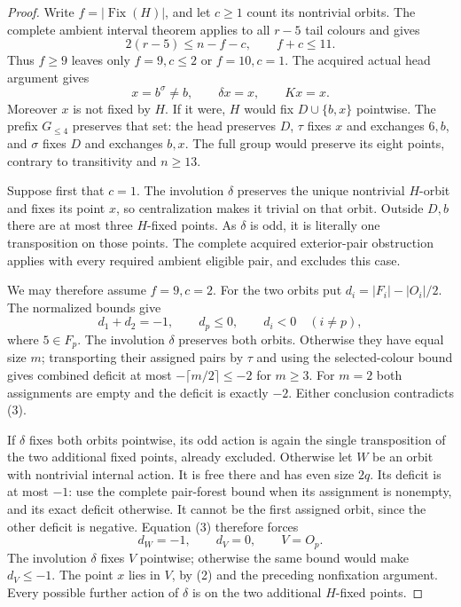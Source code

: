 \documentclass[11pt,a4paper]{article}
\begin{document}
\begin{proof}
Write $f=|\operatorname{Fix}(H)|$, and let $c\ge1$ count
its nontrivial orbits. The complete ambient interval theorem
applies to all $r-5$ tail colours and gives
\[
                  2(r-5)\le n-f-c,\qquad f+c\le11.       \tag{1}
\]
Thus $f\ge9$ leaves only $f=9,c\le2$ or $f=10,c=1$.
The acquired actual head argument gives
\[
             x=b^\sigma\ne b,\qquad \delta x=x,\qquad Kx=x.
                                                               \tag{2}
\]
Moreover $x$ is not fixed by $H$. If it were, $H$ would
fix $D\cup\{b,x\}$ pointwise. The prefix $G_{\le4}$
preserves that set: the head preserves $D$, $\tau$ fixes
$x$ and exchanges $6,b$, and $\sigma$ fixes $D$ and
exchanges $b,x$. The full group would preserve its
eight points, contrary to transitivity and $n\ge13$.

Suppose first that $c=1$. The involution $\delta$ preserves
the unique nontrivial $H$-orbit and fixes its point $x$,
so centralization makes it trivial on that orbit.
Outside $D,b$ there are at most three $H$-fixed points.
As $\delta$ is odd, it is literally one transposition
on those points. The complete acquired exterior-pair
obstruction applies with every required ambient eligible
pair, and excludes this case.

We may therefore assume $f=9,c=2$. For the two orbits put
$d_i=|F_i|-|O_i|/2$. The normalized bounds give
\[
       d_1+d_2=-1,\qquad d_p\le0,
       \qquad d_i<0\quad(i\ne p),                      \tag{3}
\]
where $5\in F_p$. The involution $\delta$ preserves
both orbits. Otherwise they have equal size $m$;
transporting their assigned pairs by $\tau$ and using
the selected-colour bound gives combined deficit at
most $-\lceil m/2\rceil\le-2$ for $m\ge3$.
For $m=2$ both assignments are empty and the deficit
is exactly $-2$. Either conclusion contradicts (3).

If $\delta$ fixes both orbits pointwise, its odd action
is again the single transposition of the two additional
fixed points, already excluded. Otherwise let $W$ be
an orbit with nontrivial internal action. It is free
there and has even size $2q$. Its deficit is at most
$-1$: use the complete pair-forest bound when its
assignment is nonempty, and its exact deficit otherwise.
It cannot be the first assigned orbit, since the other
deficit is negative. Equation (3) therefore forces
\[
        d_W=-1,\qquad d_V=0,\qquad V=O_p.
\]
The involution $\delta$ fixes $V$ pointwise; otherwise
the same bound would make $d_V\le-1$. The point $x$
lies in $V$, by (2) and the preceding nonfixation
argument. Every possible further action of $\delta$
is on the two additional $H$-fixed points.


\end{proof}
\end{document}
